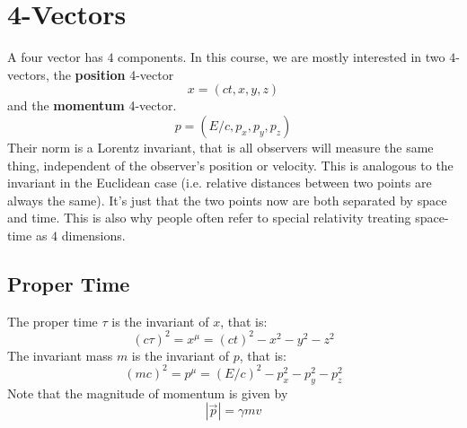 \documentclass{article}
\begin{document}
\newpage
\section{4-Vectors}
A four vector has $4$ components. In this course, we are mostly interested in two $4$-vectors, the \textbf{position} 4-vector 
\begin{equation}
    x = (ct, x, y, z)
\end{equation}
and the \textbf{momentum} 4-vector.
\begin{equation}
    p = (E/c, p_x, p_y, p_z)
\end{equation}
Their norm is a Lorentz invariant, that is all observers will measure the same thing, independent of the observer's position or velocity. This is analogous to the invariant in the Euclidean case (i.e. relative distances between two points are always the same). It's just that the two points now are both separated by space and time. This is also why people often refer to special relativity treating space-time as $4$ dimensions.
\subsection{Proper Time}
The proper time $\tau$ is the invariant of $x$, that is:
\begin{equation}
    (c\tau)^2 = x^\mu = (ct)^2 - x^2 - y^2- z^2
\end{equation}
The invariant mass $m$ is the invariant of $p$, that is:
\begin{equation}
    (mc)^2 = p^\mu = (E/c)^2 - p_x^2 - p_y^2 - p_z^2
\end{equation}
Note that the magnitude of momentum is given by
\begin{equation}
    |\vec{p}| = \gamma mv
\end{equation}
\end{document}
